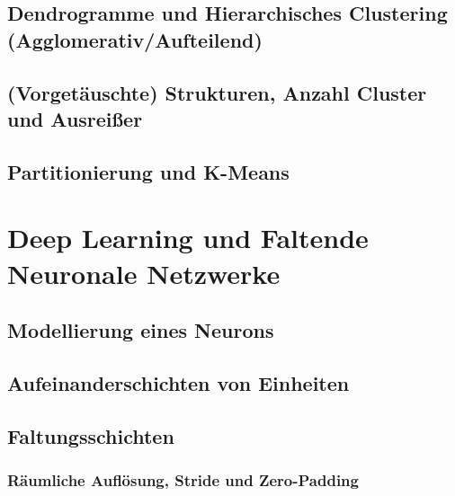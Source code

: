 	\section{Dendrogramme und Hierarchisches Clustering (Agglomerativ/Aufteilend)} %

	\section{(Vorgetäuschte) Strukturen, Anzahl Cluster und Ausreißer} %

	\section{Partitionierung und K-Means} %

\chapter{Deep Learning und Faltende Neuronale Netzwerke} %
	\label{c:deepLearning}


	\section{Modellierung eines Neurons} %

	\section{Aufeinanderschichten von Einheiten} %

	\section{Faltungsschichten} %

		\subsection{Räumliche Auflösung, Stride und Zero-Padding} %

